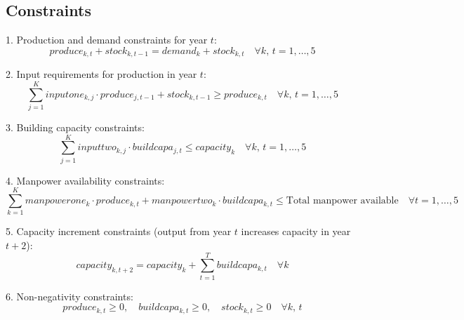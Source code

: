 \documentclass{article}
\begin{document}
\subsection*{Constraints}
1. Production and demand constraints for year \( t \):
\[
produce_{k, t} + stock_{k, t-1} = demand_{k} + stock_{k, t} \quad \forall k, \, t = 1, \ldots, 5
\]

2. Input requirements for production in year \( t \):
\[
\sum_{j=1}^{K} inputone_{k, j} \cdot produce_{j, t-1} + stock_{k, t-1} \geq produce_{k, t} \quad \forall k, \, t = 1, \ldots, 5
\]

3. Building capacity constraints:
\[
\sum_{j=1}^{K} inputtwo_{k, j} \cdot buildcapa_{j, t} \leq capacity_{k} \quad \forall k, \, t = 1, \ldots, 5
\]

4. Manpower availability constraints:
\[
\sum_{k=1}^{K} manpowerone_{k} \cdot produce_{k, t} + manpowertwo_{k} \cdot buildcapa_{k, t} \leq \text{Total manpower available} \quad \forall t = 1, \ldots, 5
\]

5. Capacity increment constraints (output from year \( t \) increases capacity in year \( t+2 \)):
\[
capacity_{k, t+2} = capacity_{k} + \sum_{t=1}^{T} buildcapa_{k, t} \quad \forall k
\]

6. Non-negativity constraints:
\[
produce_{k, t} \geq 0, \quad buildcapa_{k, t} \geq 0, \quad stock_{k, t} \geq 0 \quad \forall k, \, t
\]
\end{document}
